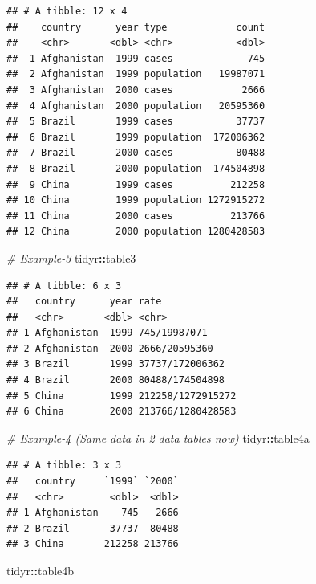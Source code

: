 \documentclass[
]{book}
\newenvironment{Shaded}{\begin{snugshade}}{\end{snugshade}}
\newcommand{\CommentTok}[1]{\textcolor[rgb]{0.56,0.35,0.01}{\textit{#1}}}
\newcommand{\NormalTok}[1]{#1}
\newcommand{\SpecialCharTok}[1]{\textcolor[rgb]{0.81,0.36,0.00}{\textbf{#1}}}
\begin{document}
\begin{verbatim}
## # A tibble: 12 x 4
##    country      year type            count
##    <chr>       <dbl> <chr>           <dbl>
##  1 Afghanistan  1999 cases             745
##  2 Afghanistan  1999 population   19987071
##  3 Afghanistan  2000 cases            2666
##  4 Afghanistan  2000 population   20595360
##  5 Brazil       1999 cases           37737
##  6 Brazil       1999 population  172006362
##  7 Brazil       2000 cases           80488
##  8 Brazil       2000 population  174504898
##  9 China        1999 cases          212258
## 10 China        1999 population 1272915272
## 11 China        2000 cases          213766
## 12 China        2000 population 1280428583
\end{verbatim}

\begin{Shaded}
\begin{Highlighting}[]
\CommentTok{\# Example{-}3}
\NormalTok{tidyr}\SpecialCharTok{::}\NormalTok{table3}
\end{Highlighting}
\end{Shaded}

\begin{verbatim}
## # A tibble: 6 x 3
##   country      year rate             
##   <chr>       <dbl> <chr>            
## 1 Afghanistan  1999 745/19987071     
## 2 Afghanistan  2000 2666/20595360    
## 3 Brazil       1999 37737/172006362  
## 4 Brazil       2000 80488/174504898  
## 5 China        1999 212258/1272915272
## 6 China        2000 213766/1280428583
\end{verbatim}

\begin{Shaded}
\begin{Highlighting}[]
\CommentTok{\# Example{-}4 (Same data in 2 data tables now)}
\NormalTok{tidyr}\SpecialCharTok{::}\NormalTok{table4a}
\end{Highlighting}
\end{Shaded}

\begin{verbatim}
## # A tibble: 3 x 3
##   country     `1999` `2000`
##   <chr>        <dbl>  <dbl>
## 1 Afghanistan    745   2666
## 2 Brazil       37737  80488
## 3 China       212258 213766
\end{verbatim}

\begin{Shaded}
\begin{Highlighting}[]
\NormalTok{tidyr}\SpecialCharTok{::}\NormalTok{table4b}
\end{Highlighting}
\end{Shaded}
\end{document}
